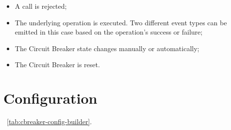 \begin{itemize}
    \item A call is rejected;
    \item The underlying operation is executed.
    Two different event types can be emitted in this case based on the operation's success or failure;
    \item The Circuit Breaker state changes manually or automatically;
    \item The Circuit Breaker is reset.
\end{itemize}


\section{Configuration}\label{sec:cbreaker-configuration}

~\ref{tab:cbreaker-config-builder}.

